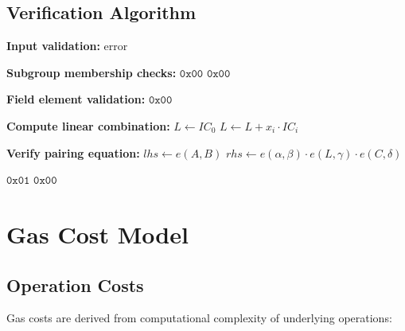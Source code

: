 \documentclass[11pt,a4paper]{article}
\theoremstyle{definition}
\begin{document}
\subsection{Verification Algorithm}

\begin{algorithm}
\caption{Groth16 Verification Precompile}
\begin{algorithmic}[1]
    \State \textbf{Input validation:}
        \State \Return error
    \EndIf

    \State \textbf{Subgroup membership checks:}
        \State \Return $\texttt{0x00}$
    \EndIf
            \State \Return $\texttt{0x00}$
        \EndIf
    \EndFor

    \State \textbf{Field element validation:}
            \State \Return $\texttt{0x00}$
        \EndIf
    \EndFor

    \State \textbf{Compute linear combination:}
    \State $L \gets IC_0$
        \State $L \gets L + x_i \cdot IC_i$
    \EndFor

    \State \textbf{Verify pairing equation:}
    \State $lhs \gets e(A, B)$
    \State $rhs \gets e(\alpha, \beta) \cdot e(L, \gamma) \cdot e(C, \delta)$

        \State \Return $\texttt{0x01}$
    \Else
        \State \Return $\texttt{0x00}$
    \EndIf
\EndFunction
\end{algorithmic}
\end{algorithm}

\section{Gas Cost Model}

\subsection{Operation Costs}

Gas costs are derived from computational complexity of underlying operations:
\end{document}
